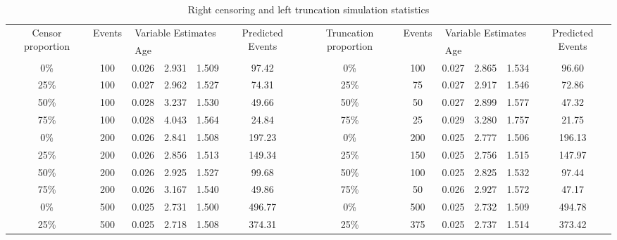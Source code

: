 \documentclass[12pt,letterpaper]{article}
\begin{document}

\begin{table}[htbp]
	\renewcommand{\arraystretch}{1.5}
	\scriptsize %
	\centering
	\caption{Right censoring and left truncation simulation statistics}
	
	\begin{tabular}{cccccc||cccccc}
		\hline
		\multicolumn{1}{c}{\multirow{2}{1.5cm}{Censor proportion}} & \multicolumn{1}{c}{\multirow{2}[3]{*}{Events}} & \multicolumn{3}{c}{Variable Estimates} & \multicolumn{1}{c}{\multirow{2}{1cm}{Predicted Events}} & \multicolumn{1}{c}{\multirow{2}{1.5cm}{Truncation proportion}} & \multicolumn{1}{c}{\multirow{2}[3]{*}{Events}} & \multicolumn{3}{c}{Variable Estimates} & \multicolumn{1}{c}{\multirow{2}{1cm}{Predicted Events}} \\
		\cline{3-5}
	    \cline{9-11}
		\multicolumn{1}{c}{} & \multicolumn{1}{c}{} & Age   & \lambda & \alpha & \multicolumn{1}{c}{} & \multicolumn{1}{c}{} & \multicolumn{1}{c}{} & Age   & \lambda & \alpha & \multicolumn{1}{c}{} \\
		\hline
				0\%   & 100   & 0.026 & 2.931 & 1.509 & 97.42 & 0\%   & 100 & 0.027 & 2.865 & 1.534 & 96.60 \\
				25\%  & 100    & 0.027 & 2.962 & 1.527 & 74.31 & 25\%  & 75 & 0.027 & 2.917 & 1.546 & 72.86 \\
				50\%  & 100    & 0.028 & 3.237 & 1.530 & 49.66 & 50\%  & 50 & 0.027 & 2.899 & 1.577 & 47.32 \\
				75\%  & 100    & 0.028 & 4.043 & 1.564 & 24.84 & 75\%  & 25 & 0.029 & 3.280 & 1.757 & 21.75 \\
				0\%   & 200   & 0.026 & 2.841 & 1.508 & 197.23 & 0\%   & 200 & 0.025 & 2.777 & 1.506 & 196.13 \\
				25\%  & 200   & 0.026 & 2.856 & 1.513 & 149.34 & 25\%  & 150   & 0.025 & 2.756 & 1.515 & 147.97 \\
				50\%  & 200   & 0.026 & 2.925 & 1.527 & 99.68 & 50\%  & 100   & 0.025 & 2.825 & 1.532 & 97.44 \\
				75\%  & 200    & 0.026 & 3.167 & 1.540 & 49.86 & 75\%  & 50    & 0.026 & 2.927 & 1.572 & 47.17 \\
				0\%   & 500   & 0.025 & 2.731 & 1.500 & 496.77 & 0\%   & 500 & 0.025 & 2.732 & 1.509 & 494.78 \\
				25\%  & 500   & 0.025 & 2.718 & 1.508 & 374.31 & 25\%  & 375 & 0.025 & 2.737 & 1.514 & 373.42 \\

\end{tabular}
\end{table}
\end{document}
